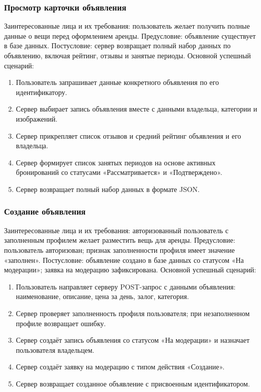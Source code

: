 \subsubsection{Просмотр карточки объявления}
Заинтересованные лица и их требования: пользователь желает получить полные данные о вещи перед оформлением аренды.
Предусловие: объявление существует в базе данных.
Постусловие: сервер возвращает полный набор данных по объявлению, включая рейтинг, отзывы и занятые периоды.
Основной успешный сценарий:
\begin{enumerate}
\item Пользователь запрашивает данные конкретного объявления по его идентификатору.
\item Сервер выбирает запись объявления вместе с данными владельца, категории и изображений.
\item Сервер прикрепляет список отзывов и средний рейтинг объявления и его владельца.
\item Сервер формирует список занятых периодов на основе активных бронирований со статусами «Рассматривается» и «Подтверждено».
\item Сервер возвращает полный набор данных в формате JSON.
\end{enumerate}

\subsubsection{Создание объявления}
Заинтересованные лица и их требования: авторизованный пользователь с заполненным профилем желает разместить вещь для аренды.
Предусловие: пользователь авторизован; признак заполненности профиля имеет значение «заполнен».
Постусловие: объявление создано в базе данных со статусом «На модерации»; заявка на модерацию зафиксирована.
Основной успешный сценарий:
\begin{enumerate}
\item Пользователь направляет серверу POST-запрос с данными объявления: наименование, описание, цена за день, залог, категория.
\item Сервер проверяет заполненность профиля пользователя; при незаполненном профиле возвращает ошибку.
\item Сервер создаёт запись объявления со статусом «На модерации» и назначает пользователя владельцем.
\item Сервер создаёт заявку на модерацию с типом действия «Создание».
\item Сервер возвращает созданное объявление с присвоенным идентификатором.
\end{enumerate}

